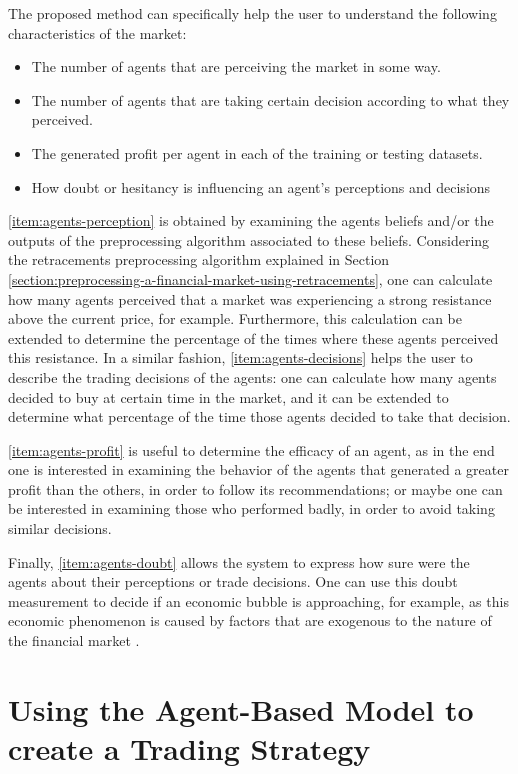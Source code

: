 The proposed method can specifically help the user to understand the following
characteristics of the market:

\begin{itemize}
\item \label{item:agents-perception} The number of agents that are perceiving
  the market in some way.
\item \label{item:agents-decisions} The number of agents that are taking certain
  decision according to what they perceived.
\item \label{item:agents-profit} The generated profit per agent in each of the
  training or testing datasets.
\item \label{item:agents-doubt} How doubt or hesitancy is influencing an agent's
  perceptions and decisions
\end{itemize}

\ref{item:agents-perception} is obtained by examining the agents beliefs and/or
the outputs of the preprocessing algorithm associated to these
beliefs. Considering the retracements preprocessing algorithm explained in
Section \ref{section:preprocessing-a-financial-market-using-retracements}, one
can calculate how many agents perceived that a market was experiencing a strong
resistance above the current price, for example. Furthermore, this calculation
can be extended to determine the percentage of the times where these agents
perceived this resistance. In a similar fashion, \ref{item:agents-decisions}
helps the user to describe the trading decisions of the agents: one can
calculate how many agents decided to buy at certain time in the market, and it
can be extended to determine what percentage of the time those agents decided to
take that decision.

\ref{item:agents-profit} is useful to determine the efficacy of an agent, as in
the end one is interested in examining the behavior of the agents that generated
a greater profit than the others, in order to follow its recommendations; or
maybe one can be interested in examining those who performed badly, in order to
avoid taking similar decisions.

Finally, \ref{item:agents-doubt} allows the system to express how sure were the
agents about their perceptions or trade decisions. One can use this doubt
measurement to decide if an economic bubble is approaching, for example, as this
economic phenomenon is caused by factors that are exogenous to the nature of the
financial market \cite{Martin2011}.

\section{Using the Agent-Based Model to create a Trading Strategy}
\label{section:using-the-agent-based-model-to-create-a-trading-strategy}


